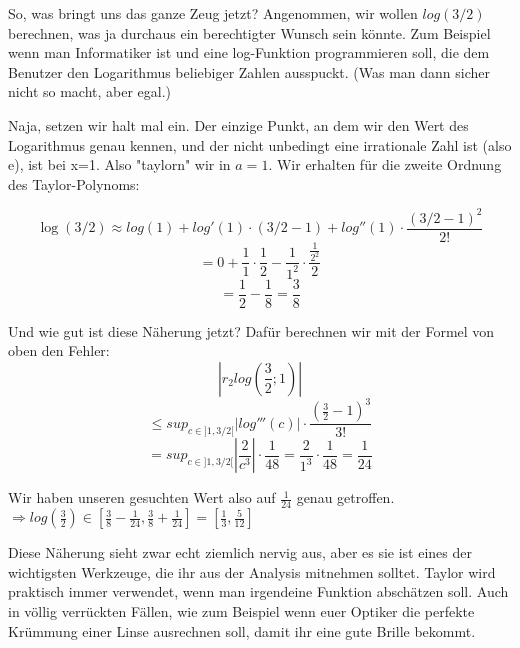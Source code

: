 \begin{example}
So, was bringt uns das ganze Zeug jetzt?
Angenommen, wir wollen $log(3/2)$ berechnen, was ja durchaus ein berechtigter Wunsch sein könnte. Zum Beispiel wenn man Informatiker ist und eine log-Funktion programmieren soll, die dem Benutzer den Logarithmus beliebiger Zahlen ausspuckt. (Was man dann sicher nicht so macht, aber egal.)

Naja, setzen wir halt mal ein. Der einzige Punkt, an dem wir den Wert des Logarithmus genau kennen, und der nicht unbedingt eine irrationale Zahl ist (also e), ist bei x=1.
Also "taylorn" wir in $a=1$.
Wir erhalten für die zweite Ordnung des Taylor-Polynoms:

$$\log(3/2) \approx log(1) + log'(1)\cdot(3/2 - 1) + log''(1)\cdot\frac{(3/2-1)^2}{2!}$$
$$= 0 + \frac{1}{1}\cdot\frac{1}{2} - \frac{1}{1^2}\cdot\frac{\frac{1}{2^2}}{2}$$
$$= \frac{1}{2} - \frac{1}{8} = \frac{3}{8}$$

Und wie gut ist diese Näherung jetzt? Dafür berechnen wir mit der Formel von oben den Fehler:
$$|r_2log(\frac{3}{2};1)|$$
$$\leq sup_{c \in ]1,3/2[}|log'''(c)|\cdot\frac{(\frac{3}{2}-1)^{3}}{3!}$$
$$= sup_{c \in ]1,3/2[}|\frac{2}{c^3}|\cdot \frac{1}{48} = \frac{2}{1^3}\cdot\frac{1}{48} = \frac{1}{24}$$

Wir haben unseren gesuchten Wert also auf $\frac{1}{24}$ genau getroffen.
$\Rightarrow log(\frac{3}{2})\in [\frac{3}{8}-\frac{1}{24}, \frac{3}{8}+\frac{1}{24}] = [\frac{1}{3}, \frac{5}{12}]$
\end{example}

\begin{concept}
Diese Näherung sieht zwar echt ziemlich nervig aus, aber es sie ist eines der wichtigsten Werkzeuge, die ihr aus der Analysis mitnehmen solltet. Taylor wird praktisch immer verwendet, wenn man irgendeine Funktion abschätzen soll. Auch in völlig verrückten Fällen, wie zum Beispiel wenn euer Optiker die perfekte Krümmung einer Linse ausrechnen soll, damit ihr eine gute Brille bekommt.
\end{concept}